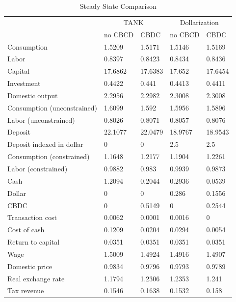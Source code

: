 \documentclass[12pt]{article}
\begin{document}
\begin{table}[h!]
\centering
\begin{tabular}{lllll}
\hline\hline
                 &\multicolumn{2}{c}{TANK}  &\multicolumn{2}{c}{Dollarization}  \\
                 &  no CBCD & CBDC & no CBCD &  CBDC  \\\hline
Consumption                 & 1.5209  & 1.5171  & 1.5146  & 1.5169  \\
Labor                       & 0.8397  & 0.8423  & 0.8434  & 0.8436  \\
Capital                     & 17.6862 & 17.6383 & 17.652  & 17.6454 \\
Investment                  & 0.4422  & 0.441   & 0.4413  & 0.4411  \\
Domestic output             & 2.2956  & 2.2982  & 2.3008  & 2.3008  \\
Consumption (unconstrained) & 1.6099  & 1.592   & 1.5956  & 1.5896  \\
Labor (unconstrained)       & 0.8026  & 0.8071  & 0.8057  & 0.8076  \\
Deposit                     & 22.1077 & 22.0479 & 18.9767 & 18.9543 \\
Deposit indexed in dollar   & 0       & 0       & 2.5     & 2.5     \\
Consumption (constrained)   & 1.1648  & 1.2177  & 1.1904  & 1.2261  \\
Labor (constrained)         & 0.9882  & 0.983   & 0.9939  & 0.9873  \\
Cash                        & 1.2094  & 0.2044  & 0.2936  & 0.0539  \\
Dollar                      & 0       & 0       & 0.286   & 0.1556  \\
CBDC                        & 0       & 0.5149  & 0       & 0.2544  \\
Transaction cost            & 0.0062  & 0.0001  & 0.0016  & 0       \\
Cost of cash                & 0.1209  & 0.0204  & 0.0294  & 0.0054  \\
Return to capital           & 0.0351  & 0.0351  & 0.0351  & 0.0351  \\
Wage                        & 1.5009  & 1.4924  & 1.4916  & 1.4907  \\
Domestic price              & 0.9834  & 0.9796  & 0.9793  & 0.9789  \\
Real exchange rate          & 1.1794  & 1.2306  & 1.2353  & 1.241   \\
Tax revenue                       & 0.1546  & 0.1638  & 0.1532  & 0.158  \\\hline
\end{tabular}
\caption{Steady State Comparison}
\label{SS}
\end{table}
      
\end{document}
